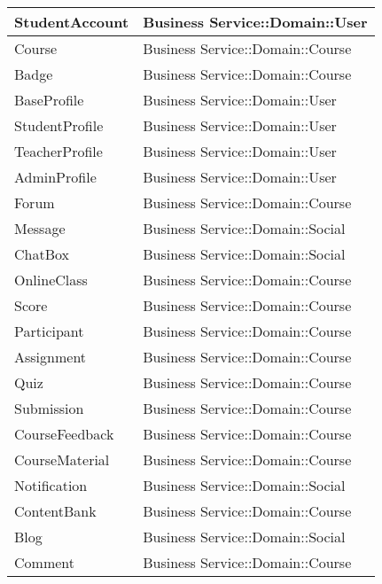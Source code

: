 \documentclass[./../main_file.tex]{subfiles}
\begin{document}
\begin{longtable}{|p{.5\linewidth}|p{.5\linewidth}|}
		StudentAccount           & Business Service::Domain::User                \\ \hline
		Course                   & Business Service::Domain::Course              \\ \hline
		Badge                    & Business Service::Domain::Course              \\ \hline
		BaseProfile              & Business Service::Domain::User                \\ \hline
		StudentProfile           & Business Service::Domain::User                \\ \hline
		TeacherProfile           & Business Service::Domain::User                \\ \hline
		AdminProfile             & Business Service::Domain::User                \\ \hline
		Forum                    & Business Service::Domain::Course              \\ \hline
		Message                  & Business Service::Domain::Social              \\ \hline
		ChatBox                  & Business Service::Domain::Social              \\ \hline
		OnlineClass              & Business Service::Domain::Course              \\ \hline
		Score                    & Business Service::Domain::Course              \\ \hline
		Participant              & Business Service::Domain::Course              \\ \hline
		Assignment               & Business Service::Domain::Course              \\ \hline
		Quiz                     & Business Service::Domain::Course              \\ \hline
		Submission               & Business Service::Domain::Course              \\ \hline
		CourseFeedback           & Business Service::Domain::Course              \\ \hline
		CourseMaterial           & Business Service::Domain::Course              \\ \hline
		Notification             & Business Service::Domain::Social              \\ \hline
		ContentBank              & Business Service::Domain::Course              \\ \hline
		Blog                     & Business Service::Domain::Social              \\ \hline
		Comment                  & Business Service::Domain::Course              \\ \hline
	\end{longtable}
\end{document}
